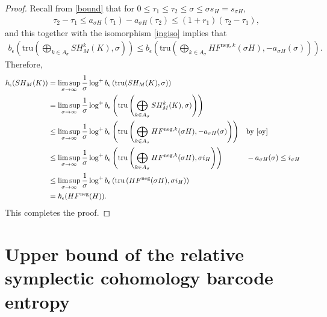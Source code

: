 \documentclass[12pt]{amsart}
\theoremstyle{definition}
\begin{document}
\begin{proof}
Recall from \eqref{bound} that for $0 \leq \tau_1 \leq \tau_2 \leq \sigma \leq \sigma s_H = s_{\sigma H}$,
\begin{align*}
\tau_2 - \tau_1 \leq a_{\sigma H}(\tau_1) - a_{\sigma H}(\tau_2) \leq (1+r_1)(\tau_2 - \tau_1),
\end{align*}
and this together with the isomorphism \eqref{ingiso} implies that 
\begin{align}\label{oy}
    b_{\epsilon} \left( \textrm{tru}\left( \bigoplus_{k \in A_\sigma} SH^{k}_M(K),\sigma \right) \right) \leq b_{\epsilon} \left( \textrm{tru}\left(\bigoplus_{k \in A_\sigma}HF^{\textrm{neg},k}(\sigma H),-a_{\sigma H}(\sigma)\right) \right).
\end{align}
Therefore,
\begin{align*}
      \hbar_\epsilon(SH_M(K)) &= \limsup_{\sigma \to \infty}\frac{1}{\sigma} \log^+b_{\epsilon} \left( \textrm{tru}(SH_M(K),\sigma) \right)\\ 
      &=\limsup_{\sigma \to \infty}\frac{1}{\sigma} \log^+b_{\epsilon} \left( \textrm{tru}\left(\bigoplus_{k \in A_\sigma}SH^k_M(K),\sigma)\right) \right)
      \\& \leq\limsup_{\sigma \to \infty}\frac{1}{\sigma} \log^+b_{\epsilon}\left( \textrm{tru}\left(\bigoplus_{k \in A_\sigma}HF^{\textrm{neg},k}(\sigma H),-a_{\sigma H}(\sigma)\right) \right)&&\textrm{by}\,\,\eqref{oy}\\
      & \leq\limsup_{\sigma \to \infty}\frac{1}{\sigma} \log^+b_{\epsilon}\left( \textrm{tru}\left(\bigoplus_{k \in A_\sigma}HF^{\textrm{neg},k}(\sigma H),\sigma i_H\right) \right)&&-a_{\sigma H}(\sigma) \leq  i_{\sigma H}\\
      &\leq\limsup_{\sigma \to \infty}\frac{1}{\sigma} \log^+b_{\epsilon}\left( \textrm{tru}\left(HF^{\textrm{neg}}(\sigma H),\sigma i_H\right) \right)\\
      &= \hbar_{\epsilon}(HF^{\textrm{neg}}(H)).
\end{align*}
This completes the proof.



\end{proof}



\section{Upper bound of the relative symplectic cohomology barcode entropy}
\end{document}

